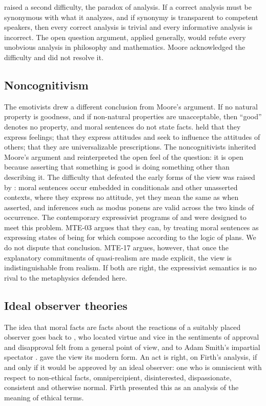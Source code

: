 \documentclass{situationist-preprint}
\begin{document}
\citet{Langford1942} raised a second difficulty, the paradox of analysis. If a correct analysis must be synonymous with what it analyzes, and if synonymy is transparent to competent speakers, then every correct analysis is trivial and every informative analysis is incorrect. The open question argument, applied generally, would refute every unobvious analysis in philosophy and mathematics. Moore acknowledged the difficulty and did not resolve it.

\subsection{Noncognitivism}

The emotivists drew a different conclusion from Moore's argument. If no natural property is goodness, and if non-natural properties are unacceptable, then \enquote{good} denotes no property, and moral sentences do not state facts. \citet{Ayer1936} held that they express feelings; \citet{Stevenson1944} that they express attitudes and seek to influence the attitudes of others; \citet{Hare1952} that they are universalizable prescriptions. The noncognitivists inherited Moore's argument and reinterpreted the open feel of the question: it is open because asserting that something is good is doing something other than describing it. The difficulty that defeated the early forms of the view was raised by \citet{Geach1965}: moral sentences occur embedded in conditionals and other unasserted contexts, where they express no attitude, yet they mean the same as when asserted, and inferences such as modus ponens are valid across the two kinds of occurrence. The contemporary expressivist programs of \citet{Blackburn1993} and \citet{Gibbard2003} were designed to meet this problem. MTE-03 argues that they can, by treating moral sentences as expressing states of being for which compose according to the logic of plans. We do not dispute that conclusion. MTE-17 argues, however, that once the explanatory commitments of quasi-realism are made explicit, the view is indistinguishable from realism. If both are right, the expressivist semantics is no rival to the metaphysics defended here.

\subsection{Ideal observer theories}

The idea that moral facts are facts about the reactions of a suitably placed observer goes back to \citet[III.i.2]{HumeTreatise}, who located virtue and vice in the sentiments of approval and disapproval felt from a general point of view, and to Adam Smith's impartial spectator \citep{SmithTMS}. \citet{Firth1952} gave the view its modern form. An act is right, on Firth's analysis, if and only if it would be approved by an ideal observer: one who is omniscient with respect to non-ethical facts, omnipercipient, disinterested, dispassionate, consistent and otherwise normal. Firth presented this as an analysis of the meaning of ethical terms.
\end{document}
